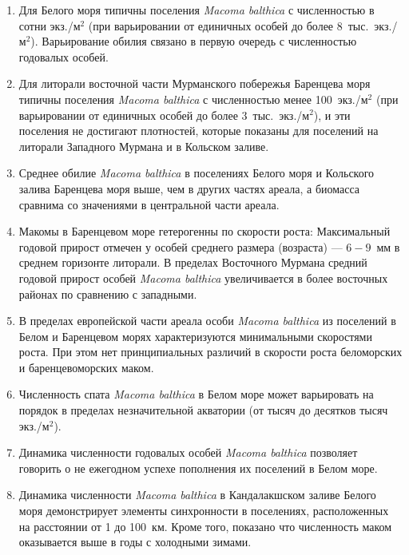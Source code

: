 	\begin{enumerate}
		\item Для Белого моря типичны поселения {\it Macoma balthica} с численностью в сотни экз./м$^2$ (при варьировании от единичных особей до более $8$~тыс.~экз./м$^2$). Варьирование обилия связано в первую очередь с численностью годовалых особей.
		\item Для литорали восточной части Мурманского побережья Баренцева моря типичны поселения {\it Macoma balthica} с численностью  менее 100~экз./м$^2$ (при варьировании от единичных особей до более $3$~тыс.~экз./м$^2$), и эти поселения не достигают плотностей, которые показаны для поселений на литорали Западного Мурмана и в Кольском заливе. %
		\item Среднее обилие {\it Macoma balthica} в поселениях Белого моря и Кольского залива Баренцева моря выше, чем в других частях ареала, а биомасса сравнима со значениями в центральной части ареала. 
		\item Макомы в Баренцевом море гетерогенны по скорости роста: Максимальный годовой прирост отмечен у особей среднего размера (возраста) --- $6 - 9$~мм в среднем горизонте литорали. В пределах Восточного Мурмана средний годовой прирост особей {\it Macoma balthica} увеличивается в более восточных районах по сравнению с западными.
		\item В пределах европейской части ареала особи {\it Macoma balthica} из поселений в Белом и Баренцевом морях характеризуются минимальными скоростями роста. При этом нет принципиальных различий в скорости роста беломорских и баренцевоморских маком.
		\item Численность спата {\it Macoma balthica} в Белом море может варьировать на порядок в пределах незначительной акватории (от тысяч до десятков тысяч экз./м$^2$).
		\item Динамика численности годовалых особей {\it Macoma balthica} позволяет говорить о не ежегодном успехе пополнения их поселений в Белом море.
		\item Динамика численности {\it Macoma balthica} в Кандалакшском заливе Белого моря демонстрирует элементы синхронности в поселениях, расположенных на расстоянии от 1 до 100~км. Кроме того, показано что численность маком оказывается выше в годы с холодными зимами.

\end{enumerate}
